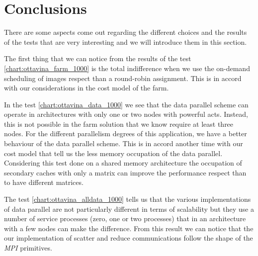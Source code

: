 \section{Conclusions}

There are some aspects come out regarding the different choices and the results of the tests that are very interesting and we will introduce them in this section.

The first thing that we can notice from the results of the test \ref{chart:ottavina_farm_1000} is the total indifference when we use the on-demand scheduling of images respect than a round-robin assignment. This is in accord with our considerations in the cost model of the farm.

In the test \ref{chart:ottavina_data_1000} we see that the data parallel scheme can operate in architectures with only one or two nodes with powerful acts. Instead, this is not possible in the farm solution that we know require at least three nodes. For the different parallelism degrees of this application, we have a better behaviour of the data parallel scheme. This is in accord another time with our cost model that tell us the less memory occupation of the data parallel. Considering this test done on a shared memory architecture the occupation of secondary caches with only a matrix can improve the performance respect than to have different matrices.

The test \ref{chart:ottavina_alldata_1000} tells us that the various implementations of data parallel are not particularly different in terms of scalability but they use a number of service processes (zero, one or two processes) that in an architecture with a few nodes can make the difference. From this result we can notice that the our implementation of scatter and reduce communications follow the shape of the \textit{MPI} primitives.